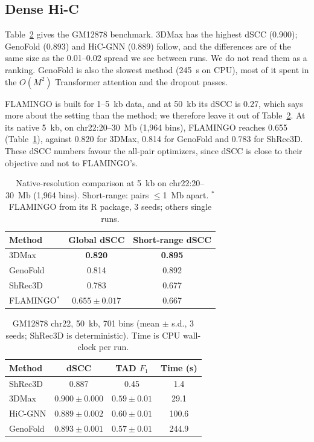 \documentclass[conference]{IEEEtran}
\begin{document}
\subsection{Dense Hi-C}
Table~\ref{tab:benchmark} gives the GM12878 benchmark. 3DMax has the
highest dSCC (0.900); GenoFold (0.893) and HiC-GNN (0.889) follow, and
the differences are of the same size as the 0.01--0.02 spread we see
between runs. We do not read them as a ranking. GenoFold is also the
slowest method (245~s on CPU), most of it spent in the $O(M^2)$
Transformer attention and the dropout passes.

FLAMINGO is built for 1--5~kb data, and at 50~kb its dSCC is 0.27, which
says more about the setting than the method; we therefore leave it out of
Table~\ref{tab:benchmark}. At its native 5~kb, on chr22:20--30~Mb (1{,}964
bins), FLAMINGO reaches 0.655 (Table~\ref{tab:5kb}), against 0.820 for 3DMax, 0.814 for GenoFold
and 0.783 for ShRec3D. These dSCC numbers favour the all-pair optimizers,
since dSCC is close to their objective and not to FLAMINGO's.

\begin{table}[t]
\caption{Native-resolution comparison at 5~kb on chr22:20--30~Mb (1{,}964
bins). Short-range: pairs $\le$1~Mb apart. $^{\ast}$FLAMINGO from its R
package, 3 seeds; others single runs.}
\label{tab:5kb}
\centering
\begin{tabular}{@{}lcc@{}}
\toprule
Method & Global dSCC & Short-range dSCC \\
\midrule
3DMax & \textbf{0.820} & \textbf{0.895} \\
GenoFold & 0.814 & 0.892 \\
ShRec3D & 0.783 & 0.677 \\
FLAMINGO$^{\ast}$ & $0.655\pm0.017$ & 0.667 \\
\bottomrule
\end{tabular}
\end{table}

\begin{table}[t]
\caption{GM12878 chr22, 50~kb, 701 bins (mean $\pm$ s.d., 3 seeds;
ShRec3D is deterministic). Time is CPU wall-clock per run.}
\label{tab:benchmark}
\centering
\setlength{\tabcolsep}{4pt}
\begin{tabular}{@{}lccc@{}}
\toprule
Method & dSCC & TAD $F_1$ & Time (s) \\
\midrule
ShRec3D  & 0.887 & 0.45 & 1.4 \\
3DMax    & $\mathbf{0.900}\pm0.000$ & $0.59\pm0.01$ & 29.1 \\
HiC-GNN  & $0.889\pm0.002$ & $\mathbf{0.60}\pm0.01$ & 100.6 \\
GenoFold & $0.893\pm0.001$ & $0.57\pm0.01$ & 244.9 \\
\bottomrule
\end{tabular}
\end{table}
\end{document}
